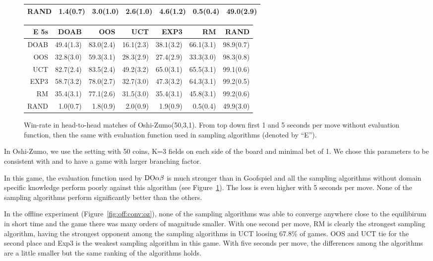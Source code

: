 \begin{figure}[t!]
\begin{scriptsize}
\begin{tabular}{|r|rrrrrr|}
RAND&1.4(0.7)&3.0(1.0)&2.6(1.0)&4.6(1.2)&0.5(0.4)&49.0(2.9)\\
\hline
\end{tabular}
\begin{tabular}{|r|rrrrrr|}\hline
E 5s&DOAB&OOS&UCT&EXP3&RM&RAND\\\hline
DOAB&49.4(1.3)&83.0(2.4)&16.1(2.3)&38.1(3.2)&66.1(3.1)&98.9(0.7)\\
OOS&32.8(3.0)&59.3(3.1)&28.3(2.9)&27.4(2.9)&33.3(3.0)&98.3(0.8)\\
UCT&82.7(2.4)&83.5(2.4)&49.2(3.2)&65.0(3.1)&65.5(3.1)&99.1(0.6)\\
EXP3&58.7(3.2)&78.0(2.7)&32.7(3.0)&47.3(3.2)&64.3(3.1)&99.2(0.5)\\
RM&35.4(3.1)&77.1(2.6)&31.5(3.0)&35.4(3.1)&45.8(3.1)&99.2(0.6)\\
RAND&1.0(0.7)&1.8(0.9)&2.0(0.9)&1.9(0.9)&0.5(0.4)&49.9(3.0)\\
\hline
\end{tabular}

\end{scriptsize}
\caption{Win-rate in head-to-head matches of Oshi-Zumo(50,3,1). From top down first 1 and 5 seconds per move without evaluation function, then the same with evaluation function used in sampling algorithms (denoted by ``E'').}\label{fig:matches:oz}
\end{figure}

In Oshi-Zumo, we use the setting with 50 coins, K=3 fields on each side of the board and minimal bet of 1. We chose this parameters to be consistent with \cite{} and to have a game with larger branching factor.

In this game, the evaluation function used by $\textrm{DO}\alpha\beta$ is much stronger than in Goofspiel and all the sampling algorithms without domain specific knowledge perform poorly against this algorithm (see Figure~\ref{fig:matches:oz}). The loss is even higher with 5 seconds per move. None of the sampling algorithms perform significantly better than the others.

In the offline experiment (Figure~\ref{fig:off:conv:oz}), none of the sampling algorithms was able to converge anywhere close to the equilibirum in short time and the game there was many orders of magnitude smaller. With one second per move, RM is clearly the strongest sampling algorithm, having the strongest opponent among the sampling algorithms in UCT loosing 67.8\% of games. OOS and UCT tie for the second place and Exp3 is the weakest sampling algorithm in this game. With five seconds per move, the differences among the algorithms are a little smaller but the same ranking of the algorithms holds.

